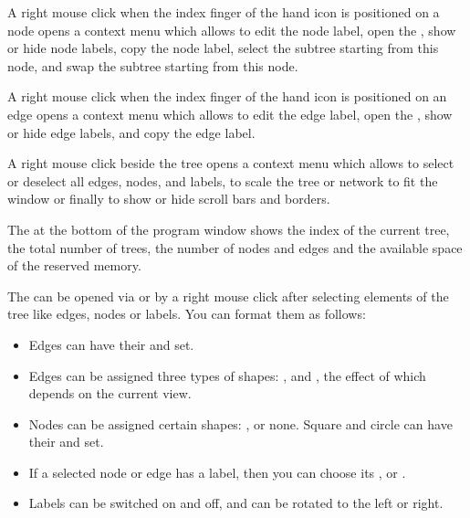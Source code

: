 \documentclass[11pt]{article}
\begin{document}
A right mouse click when the index finger of the hand icon is positioned on a node opens a context menu which allows to
edit the node label, open the , show or hide node labels, copy the node label, select the subtree starting from this node, and swap the subtree starting from this node.

A right mouse click when the index finger of the hand icon is positioned on an edge opens a context menu which allows to
edit the edge label, open the , show or hide edge labels, and copy the edge label.

A right mouse click beside the tree opens a context menu which allows to select or deselect all edges, nodes, and labels, to scale the tree or network to fit the window or finally to show or hide scroll bars and borders.



The  at the bottom of the program window shows the index of the current tree,
the total number of trees, the number of nodes and edges and the available space of the reserved memory. 




The  can be opened via  or by a right mouse click 
after selecting elements of the tree like edges, nodes or labels.
You can format them as follows:

\begin{itemize}
\item Edges can have their  and    set.
\item Edges can be assigned three types of shapes: , 
and ,
the effect of which depends on the current view.
\item Nodes can be assigned certain shapes: ,  or none.
Square and circle  can have their  and  set.
\item 
If a selected node or edge has a label, then you can choose its , 
or .
\item Labels can be switched on and off, and can be rotated to the left or right. 
\end{itemize}
\end{document}
